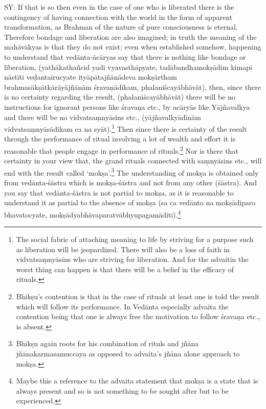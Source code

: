 SY: If that is so then even in the case of one who is liberated there is the contingency of having connection with the world in the form of apparent transformation, as Brahman of the nature of pure consciousness is eternal. Therefore bondage and liberation are also imagined;  in truth  the meaning of the mahāvākyas is that they do not exist;  even when established somehow, happening to understand that vedānta-ācāryas say that there is nothing like bondage or liberation, (yathākathañcid yadi vyavasthāpyate, tadābandhamokṣādim kimapi nāstīti veḍantairucyate ityāpātajñānādeva mokṣārtham brahmasākṣāt\-kārāyājñānām śravaṇādikam, phalaniścayābhāvāt), then, since there is no certainty regarding the result, (phalaniścayābhāvāt) there will be no instructions for ignorant persons like śravaṇa etc., by acāryās like Yājñavalkya and there will be no vidvatsaṃnyāsins etc., (yājñavalkyā\-dīnām vidvatsaṃnyāsādikam ca na syāt).\footnote{The social fabric of attaching meaning to life by striving for a purpose such as liberation will be jeopardized. There will also be a loss of faith in vidvatsaṃnyāsins who are striving for liberation. And for the advaitin the worst thing can happen is that there will be a belief in the efficacy of rituals.} Then since there is certainty of the result through the performance of ritual involving a lot of wealth and effort it is reasonable that people engage in performance of rituals.\footnote{Bhikṣu’s contention is that in the case of rituals at least one is told the result which will  follow its performance. In Vedānta especially advaita the contention being that one is always free the motivation to follow śravaṇa etc., is absent.} Nor is there that certainty in your view that, the grand rituals connected with saṃnyāsins etc., will end with the result called ‘mokṣa’.\footnote{Bhikṣu again roots for his combination of rituls and jñāna jñānakarmasamuccaya as opposed to advaita’s jñāna alone approach to mokṣa.} The understanding of mokṣa is obtained only from vedānta-śāstra which is mokṣa-śāstra and not from any other (śāstra). And you say that vedānta-śāstra is not partial to mokṣa, as it is reasonable to understand it as partial to the absence of mokṣa (sa ca vedānto na mokṣādiparo bhavatocyate, mokṣādyabhāvaparatvābhyupagamāditi).\footnote{Maybe this a reference to the advaita statement that mokṣa is a state that is always present and so is not something to be sought after but to be experienced.}


